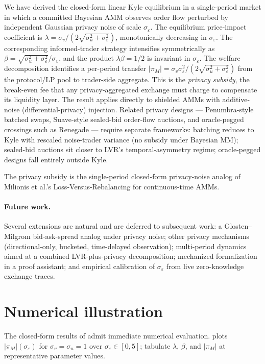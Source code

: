 \documentclass[runningheads]{llncs}
\newcommand{\sigv}{\sigma_v}
\newcommand{\sigu}{\sigma_u}
\newcommand{\sige}{\sigma_\varepsilon}
\begin{document}
We have derived the closed-form linear Kyle equilibrium in a
single-period market in which a committed Bayesian AMM observes
order flow perturbed by independent Gaussian privacy noise of
scale $\sige$. The equilibrium price-impact coefficient is
$\lambda = \sigv/(2\sqrt{\sigu^2 + \sige^2})$, monotonically
decreasing in $\sige$. The corresponding informed-trader strategy
intensifies symmetrically as $\beta = \sqrt{\sigu^2+\sige^2}/\sigv$,
and the product $\lambda\beta = 1/2$ is invariant in $\sige$.
The welfare decomposition identifies a per-period transfer
$|\pi_M| = \sigv\sige^2/(2\sqrt{\sigu^2+\sige^2})$ from the
protocol/LP pool to trader-side aggregate. This is the
\emph{privacy subsidy}, the break-even fee that any
privacy-aggregated exchange must charge to compensate its
liquidity layer. The result applies directly to shielded
AMMs with additive-noise (differential-privacy) injection.
Related privacy designs --- Penumbra-style batched swaps,
Suave-style sealed-bid order-flow auctions, and oracle-pegged
crossings such as Renegade --- require separate frameworks:
batching reduces to Kyle with rescaled noise-trader variance
(no subsidy under Bayesian MM); sealed-bid auctions sit closer
to LVR's temporal-asymmetry regime; oracle-pegged designs fall
entirely outside Kyle.

The privacy subsidy is the single-period closed-form
privacy-noise analog of Milionis et al.'s
Loss-Versus-Rebalancing for continuous-time AMMs.

\paragraph{Future work.}
Several extensions are natural and are deferred to subsequent
work: a Glosten--Milgrom bid-ask-spread analog under privacy
noise; other privacy mechanisms (directional-only, bucketed,
time-delayed observation); multi-period dynamics aimed at a
combined LVR-plus-privacy decomposition; mechanized formalization
in a proof assistant; and empirical calibration of $\sige$ from
live zero-knowledge exchange traces.

\appendix

\section{Numerical illustration}
\label{app:numerical}

The closed-form results of 
admit immediate numerical evaluation.  plots
$|\pi_M|(\sige)$ for $\sigv = \sigu = 1$ over $\sige \in [0, 5]$;
 tabulate $\lambda$, $\beta$, and
$|\pi_M|$ at representative parameter values.
\end{document}
